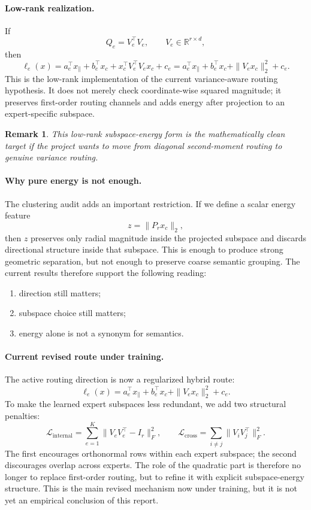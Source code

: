 \documentclass[11pt]{article}
\newtheorem{remark}{Remark}
\begin{document}
\paragraph{Low-rank realization.}
If
\[
Q_e = V_e^\top V_e,
\qquad
V_e\in\mathbb{R}^{r\times d},
\]
then
\[
\ell_e(x)
=
a_e^\top x_{\parallel}
+
b_e^\top x_c
+
x_c^\top V_e^\top V_e x_c
+
c_e
=
a_e^\top x_{\parallel}
+
b_e^\top x_c
+
\|V_e x_c\|_2^2
+
c_e.
\]
This is the low-rank implementation of the current variance-aware routing hypothesis. It does not merely check coordinate-wise squared magnitude; it preserves first-order routing channels and adds energy after projection to an expert-specific subspace.

\begin{remark}
This low-rank subspace-energy form is the mathematically clean target if the project wants to move from diagonal second-moment routing to genuine variance routing.
\end{remark}

\paragraph{Why pure energy is not enough.}
The clustering audit adds an important restriction. If we define a scalar energy feature
\[
z=\|P_r x_c\|_2,
\]
then $z$ preserves only radial magnitude inside the projected subspace and discards directional structure inside that subspace. This is enough to produce strong geometric separation, but not enough to preserve coarse semantic grouping. The current results therefore support the following reading:
\begin{enumerate}
    \item direction still matters;
    \item subspace choice still matters;
    \item energy alone is not a synonym for semantics.
\end{enumerate}

\paragraph{Current revised route under training.}
The active routing direction is now a regularized hybrid route:
\[
\ell_e(x)
=
a_e^\top x_{\parallel}
+
b_e^\top x_c
+
\|V_e x_c\|_2^2
+
c_e.
\]
To make the learned expert subspaces less redundant, we add two structural penalties:
\[
\mathcal{L}_{\mathrm{internal}}
=
\sum_{e=1}^{K}\|V_eV_e^\top-I_r\|_F^2,
\qquad
\mathcal{L}_{\mathrm{cross}}
=
\sum_{i\neq j}\|V_iV_j^\top\|_F^2.
\]
The first encourages orthonormal rows within each expert subspace; the second discourages overlap across experts. The role of the quadratic part is therefore no longer to replace first-order routing, but to refine it with explicit subspace-energy structure. This is the main revised mechanism now under training, but it is not yet an empirical conclusion of this report.
\end{document}
